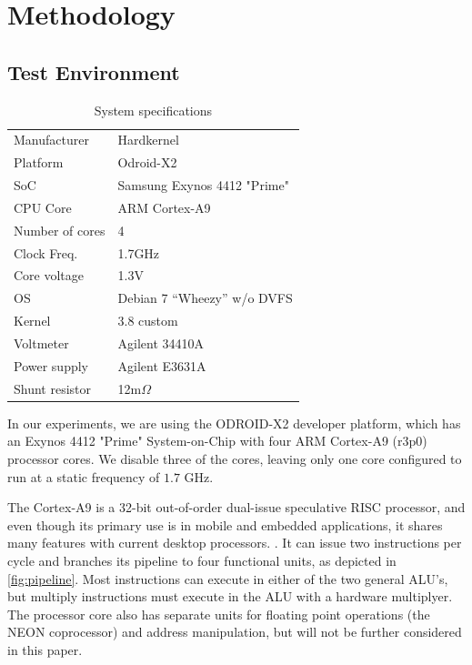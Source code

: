 \section{Methodology}


\subsection{Test Environment}
\begin{table}
    \begin{tabular}{l|l}
        \hline
        \hline
    Manufacturer    &Hardkernel\\
Platform            &Odroid-X2\\
SoC                 &Samsung Exynos 4412 "Prime"\\
CPU Core            &ARM Cortex-A9\\
Number of cores     &4\\
Clock Freq.         &1.7GHz\\
Core voltage        &1.3V\\
OS                  &Debian 7 ``Wheezy'' w/o DVFS\\
Kernel              &3.8 custom\\
        \hline
        \hline
        Voltmeter   &Agilent 34410A\\
        Power supply &Agilent E3631A\\
        Shunt resistor &12m$\Omega$\\
        \hline
        \hline
    \end{tabular}
    \caption{System specifications}
\end{table}
In our experiments, we are using the ODROID-X2 \cite{odroid-x2} developer
platform, which has an Exynos 4412 "Prime" System-on-Chip with four ARM
Cortex-A9 (r3p0) processor cores. We disable three of the cores, leaving only
one core configured to run at a static frequency of $1.7$ GHz.

The Cortex-A9 is a 32-bit out-of-order dual-issue speculative RISC processor,
and even though its primary use is in mobile and embedded applications, it
shares many features with current desktop processors. \cite{patterson}
\cite{hennessy}. It can issue two instructions per cycle and branches its
pipeline to four functional units, as depicted in \autoref{fig:pipeline}. Most
instructions can execute in either of the two general ALU's, but multiply
instructions must execute in the ALU with a hardware multiplyer. The processor
core also has separate units for floating point operations (the NEON
coprocessor) and address manipulation, but will not be further considered in
this paper.

